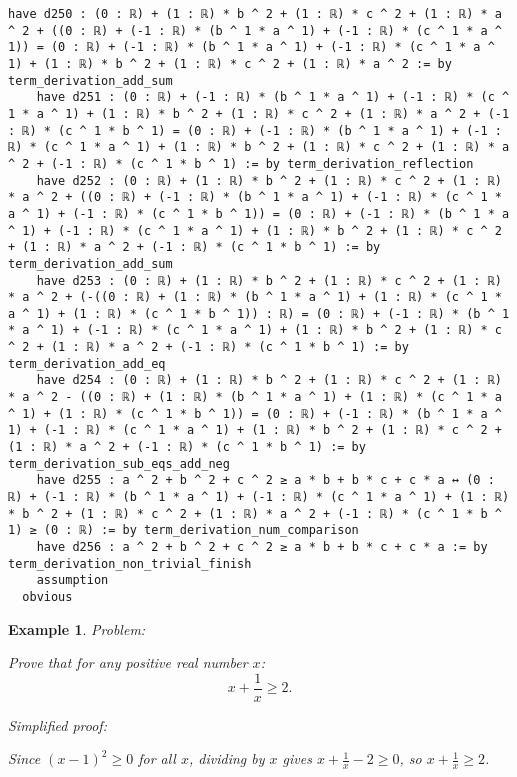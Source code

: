 \documentclass{article}
\newtheorem{example}{Example}
\begin{document}
\begin{tcolorbox}[colback=white!10, width=\linewidth]
\begin{lstlisting}[language=Lean4]
    have d250 : (0 : ℝ) + (1 : ℝ) * b ^ 2 + (1 : ℝ) * c ^ 2 + (1 : ℝ) * a ^ 2 + ((0 : ℝ) + (-1 : ℝ) * (b ^ 1 * a ^ 1) + (-1 : ℝ) * (c ^ 1 * a ^ 1)) = (0 : ℝ) + (-1 : ℝ) * (b ^ 1 * a ^ 1) + (-1 : ℝ) * (c ^ 1 * a ^ 1) + (1 : ℝ) * b ^ 2 + (1 : ℝ) * c ^ 2 + (1 : ℝ) * a ^ 2 := by term_derivation_add_sum
    have d251 : (0 : ℝ) + (-1 : ℝ) * (b ^ 1 * a ^ 1) + (-1 : ℝ) * (c ^ 1 * a ^ 1) + (1 : ℝ) * b ^ 2 + (1 : ℝ) * c ^ 2 + (1 : ℝ) * a ^ 2 + (-1 : ℝ) * (c ^ 1 * b ^ 1) = (0 : ℝ) + (-1 : ℝ) * (b ^ 1 * a ^ 1) + (-1 : ℝ) * (c ^ 1 * a ^ 1) + (1 : ℝ) * b ^ 2 + (1 : ℝ) * c ^ 2 + (1 : ℝ) * a ^ 2 + (-1 : ℝ) * (c ^ 1 * b ^ 1) := by term_derivation_reflection
    have d252 : (0 : ℝ) + (1 : ℝ) * b ^ 2 + (1 : ℝ) * c ^ 2 + (1 : ℝ) * a ^ 2 + ((0 : ℝ) + (-1 : ℝ) * (b ^ 1 * a ^ 1) + (-1 : ℝ) * (c ^ 1 * a ^ 1) + (-1 : ℝ) * (c ^ 1 * b ^ 1)) = (0 : ℝ) + (-1 : ℝ) * (b ^ 1 * a ^ 1) + (-1 : ℝ) * (c ^ 1 * a ^ 1) + (1 : ℝ) * b ^ 2 + (1 : ℝ) * c ^ 2 + (1 : ℝ) * a ^ 2 + (-1 : ℝ) * (c ^ 1 * b ^ 1) := by term_derivation_add_sum
    have d253 : (0 : ℝ) + (1 : ℝ) * b ^ 2 + (1 : ℝ) * c ^ 2 + (1 : ℝ) * a ^ 2 + (-((0 : ℝ) + (1 : ℝ) * (b ^ 1 * a ^ 1) + (1 : ℝ) * (c ^ 1 * a ^ 1) + (1 : ℝ) * (c ^ 1 * b ^ 1)) : ℝ) = (0 : ℝ) + (-1 : ℝ) * (b ^ 1 * a ^ 1) + (-1 : ℝ) * (c ^ 1 * a ^ 1) + (1 : ℝ) * b ^ 2 + (1 : ℝ) * c ^ 2 + (1 : ℝ) * a ^ 2 + (-1 : ℝ) * (c ^ 1 * b ^ 1) := by term_derivation_add_eq
    have d254 : (0 : ℝ) + (1 : ℝ) * b ^ 2 + (1 : ℝ) * c ^ 2 + (1 : ℝ) * a ^ 2 - ((0 : ℝ) + (1 : ℝ) * (b ^ 1 * a ^ 1) + (1 : ℝ) * (c ^ 1 * a ^ 1) + (1 : ℝ) * (c ^ 1 * b ^ 1)) = (0 : ℝ) + (-1 : ℝ) * (b ^ 1 * a ^ 1) + (-1 : ℝ) * (c ^ 1 * a ^ 1) + (1 : ℝ) * b ^ 2 + (1 : ℝ) * c ^ 2 + (1 : ℝ) * a ^ 2 + (-1 : ℝ) * (c ^ 1 * b ^ 1) := by term_derivation_sub_eqs_add_neg
    have d255 : a ^ 2 + b ^ 2 + c ^ 2 ≥ a * b + b * c + c * a ↔ (0 : ℝ) + (-1 : ℝ) * (b ^ 1 * a ^ 1) + (-1 : ℝ) * (c ^ 1 * a ^ 1) + (1 : ℝ) * b ^ 2 + (1 : ℝ) * c ^ 2 + (1 : ℝ) * a ^ 2 + (-1 : ℝ) * (c ^ 1 * b ^ 1) ≥ (0 : ℝ) := by term_derivation_num_comparison
    have d256 : a ^ 2 + b ^ 2 + c ^ 2 ≥ a * b + b * c + c * a := by term_derivation_non_trivial_finish
    assumption
  obvious

\end{lstlisting}
\end{tcolorbox}


\begin{example}
Problem:
\begin{tcolorbox}[colback=yellow!10, width=\linewidth]
Prove that for any positive real number $x$:
    $$x + \frac{1}{x} \geq 2.$$
\end{tcolorbox}

Simplified proof:
\begin{tcolorbox}[colback=blue!10, width=\linewidth]
Since $(x-1)^2 \ge 0$ for all $x$, dividing by $x$ gives $x + \frac{1}{x} - 2 \ge 0$, so $x + \frac{1}{x} \ge 2$.
\end{tcolorbox}
\end{example}
\end{document}
